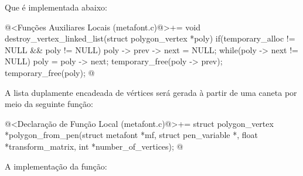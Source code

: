 {{{{{{Que é implementada abaixo:

\iniciocodigo
@<Funções Auxiliares Locais (metafont.c)@>+=
void destroy_vertex_linked_list(struct polygon_vertex *poly){
  if(temporary_alloc != NULL && poly != NULL){
    poly -> prev -> next = NULL;
    while(poly -> next != NULL){
      poly = poly -> next;
      temporary_free(poly -> prev);
    }
    temporary_free(poly);
  }
}
@
\fimcodigo

A lista duplamente encadeada de vértices será gerada à partir de
uma caneta por meio da seguinte função:

\iniciocodigo
@<Declaração de Função Local (metafont.c)@>+=
struct polygon_vertex *polygon_from_pen(struct metafont *mf,
                                       struct pen_variable *,
                                       float *transform_matrix,
                                       int *number_of_vertices);
@
\fimcodigo

A implementação da função:

}}}}}}

